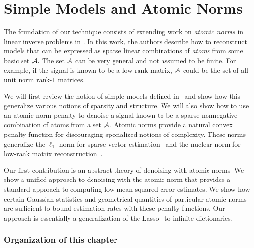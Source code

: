 \chapter{Simple Models and Atomic Norms}
\label{chap:ast}

The foundation of our technique consists of extending work on \emph{atomic
norms} in linear inverse problems in \cite{crpw}. In this work, the authors
describe how to reconstruct models that can be expressed as sparse linear
combinations of \emph{atoms} from some basic set $\mathcal{A}.$ The set $\mathcal{A}$ can be very
general and not assumed to be finite. For example, if the signal is known to be
a low rank matrix, $\mathcal{A}$ could be the set of all unit norm rank-$1$ matrices.

We will first review the notion of simple models defined in~\cite{crpw} and show
how this generalize various notions of sparsity and structure. We will also show
how to use an atomic norm penalty to denoise a signal known to be a sparse
nonnegative combination of atoms from a set $\mathcal{A}$. Atomic norms provide a natural
convex penalty function for discouraging specialized notions of complexity.
These norms generalize the $\ell_1$ norm for sparse vector
estimation~\cite{candes06} and the nuclear norm for low-rank matrix
reconstruction~\cite{Recht10,CandesRecht09}.

Our first contribution is an abstract theory of denoising with atomic norms. We
show a unified approach to denoising with the atomic norm that provides a
standard approach to computing low mean-squared-error estimates. We show how
certain Gaussian statistics and geometrical quantities of particular atomic
norms are sufficient to bound estimation rates with these penalty functions. Our
approach is essentially a generalization of the Lasso~\cite{tibshirani96,chen98}
to infinite dictionaries.


\subsection*{Organization of this chapter}

